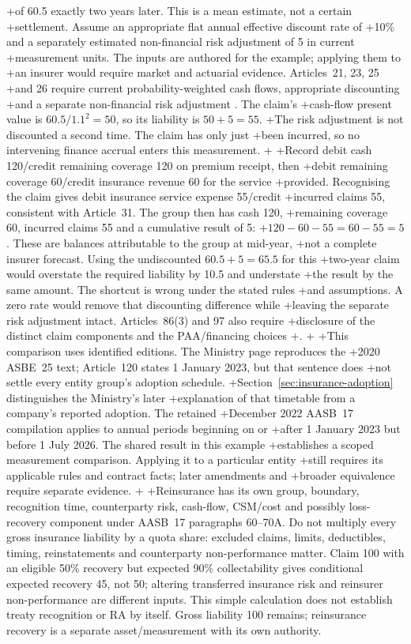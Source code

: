 +of 60.5 exactly two years later. This is a mean estimate, not a certain
+settlement. Assume an appropriate flat annual effective discount rate of
+10\% and a separately estimated non-financial risk adjustment of 5 in current
+measurement units. The inputs are authored for the example; applying them to
+an insurer would require market and actuarial evidence. Articles~21, 23, 25
+and 26 require current probability-weighted cash flows, appropriate discounting
+and a separate non-financial risk adjustment \citep{mofasbe25}. The claim's
+cash-flow present value is $60.5/1.1^2=50$, so its liability is $50+5=55$.
+The risk adjustment is not discounted a second time. The claim has only just
+been incurred, so no intervening finance accrual enters this measurement.
+
+Record debit cash 120/credit remaining coverage 120 on premium receipt, then
+debit remaining coverage 60/credit insurance revenue 60 for the service
+provided. Recognising the claim gives debit insurance service expense 55/credit
+incurred claims 55, consistent with Article~31. The group then has cash 120,
+remaining coverage 60, incurred claims 55 and a cumulative result of 5:
+$120-60-55=60-55=5$. These are balances attributable to the group at mid-year,
+not a complete insurer forecast. Using the undiscounted $60.5+5=65.5$ for this
+two-year claim would overstate the required liability by 10.5 and understate
+the result by the same amount. The shortcut is wrong under the stated rules
+and assumptions. A zero rate would remove that discounting difference while
+leaving the separate risk adjustment intact. Articles~86(3) and 97 also require
+disclosure of the distinct claim components and the PAA/financing choices
+\citep{mofasbe25}.
+
+This comparison uses identified editions. The Ministry page reproduces the
+2020 ASBE~25 text; Article~120 states 1 January 2023, but that sentence does
+not settle every entity group's adoption schedule.
+Section~\ref{sec:insurance-adoption} distinguishes the Ministry's later
+explanation of that timetable from a company's reported adoption. The retained
+December 2022 AASB~17 compilation applies to annual periods beginning on or
+after 1 January 2023 but before 1 July 2026. The shared result in this example
+establishes a scoped measurement comparison. Applying it to a particular entity
+still requires its applicable rules and contract facts; later amendments and
+broader equivalence require separate evidence.
+
+Reinsurance has its own group, boundary, recognition time, counterparty risk, cash-flow, CSM/cost and possibly loss-recovery component under AASB~17 paragraphs 60--70A. Do not multiply every gross insurance liability by a quota share: excluded claims, limits, deductibles, timing, reinstatements and counterparty non-performance matter. Claim 100 with an eligible 50\% recovery but expected 90\% collectability gives conditional expected recovery 45, not 50; altering transferred insurance risk and reinsurer non-performance are different inputs. This simple calculation does not establish treaty recognition or RA by itself. Gross liability 100 remains; reinsurance recovery is a separate asset/measurement with its own authority.
 
